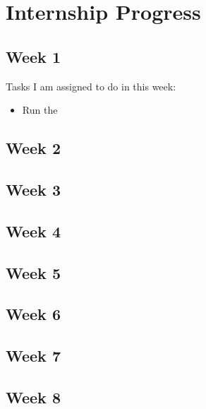 \section{Internship Progress}
\subsection{Week 1}
Tasks I am assigned to do in this week:
\begin{itemize}
	\item Run the
\end{itemize}
\subsection{Week 2}
\subsection{Week 3}
\subsection{Week 4}
\subsection{Week 5}
\subsection{Week 6}
\subsection{Week 7}
\subsection{Week 8}
